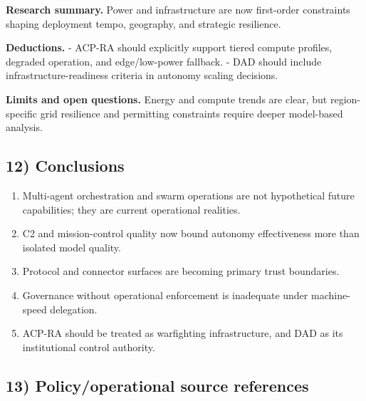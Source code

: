\documentclass[11pt]{article}
\begin{document}
\textbf{Research summary.} Power and infrastructure are now first-order
constraints shaping deployment tempo, geography, and strategic
resilience.

\textbf{Deductions.} - ACP-RA should explicitly support tiered compute
profiles, degraded operation, and edge/low-power fallback. - DAD should
include infrastructure-readiness criteria in autonomy scaling decisions.

\textbf{Limits and open questions.} Energy and compute trends are clear,
but region-specific grid resilience and permitting constraints require
deeper model-based analysis.

\hypertarget{conclusions}{%
\subsection{12) Conclusions}\label{conclusions}}

\begin{enumerate}
\def\labelenumi{\arabic{enumi}.}
\tightlist
\item
  Multi-agent orchestration and swarm operations are not hypothetical
  future capabilities; they are current operational realities.
\item
  C2 and mission-control quality now bound autonomy effectiveness more
  than isolated model quality.
\item
  Protocol and connector surfaces are becoming primary trust boundaries.
\item
  Governance without operational enforcement is inadequate under
  machine-speed delegation.
\item
  ACP-RA should be treated as warfighting infrastructure, and DAD as its
  institutional control authority.
\end{enumerate}

\hypertarget{policyoperational-source-references}{%
\subsection{13) Policy/operational source
references}\label{policyoperational-source-references}}
\end{document}
